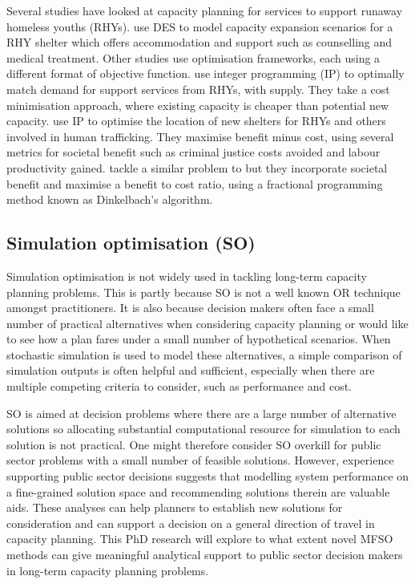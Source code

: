 \documentclass[12pt,a4paper]{article}
\begin{document}
Several studies have looked at capacity planning for services to support runaway homeless youths (RHYs). \cite{kaya2022discrete} use DES to model capacity expansion scenarios for a RHY shelter which offers accommodation and support such as counselling and medical treatment. Other studies use optimisation frameworks, each using a different format of objective function. \cite{kaya2022improving} use integer programming (IP) to optimally match demand for support services from RHYs, with supply. They take a cost minimisation approach, where existing capacity is cheaper than potential new capacity. \cite{maass2020optimizing} use IP to optimise the location of new shelters for RHYs and others involved in human trafficking. They maximise benefit minus cost, using several metrics for societal benefit such as criminal justice costs avoided and labour productivity gained. \cite{miller2022optimization} tackle a similar problem to \cite{kaya2022improving} but they incorporate societal benefit and maximise a benefit to cost ratio, using a fractional programming method known as Dinkelbach's algorithm. 

\subsection{Simulation optimisation (SO)} \label{so}

Simulation optimisation is not widely used in tackling long-term capacity planning problems. This is partly because SO is not a well known OR technique amongst practitioners. It is also because decision makers often face a small number of practical alternatives when considering capacity planning or would like to see how a plan fares under a small number of hypothetical scenarios. When stochastic simulation is used to model these alternatives, a simple comparison of simulation outputs is often helpful and sufficient, especially when there are multiple competing criteria to consider, such as performance and cost.

SO is aimed at decision problems where there are a large number of alternative solutions so allocating substantial computational resource for simulation to each solution is not practical. One might therefore consider SO overkill for public sector problems with a small number of feasible solutions. However, experience supporting public sector decisions suggests that modelling system performance on a fine-grained solution space and recommending solutions therein are valuable aids. These analyses can help planners to establish new solutions for consideration and can support a decision on a general direction of travel in capacity planning. This PhD research will explore to what extent novel MFSO methods can give meaningful analytical support to public sector decision makers in long-term capacity planning problems.
\end{document}
